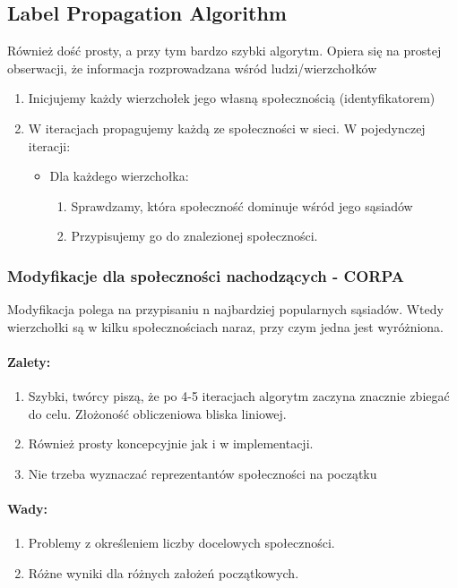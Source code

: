 \documentclass{article}
\begin{document}
\subsection{Label Propagation Algorithm}
Również dość prosty, a przy tym bardzo szybki algorytm. Opiera się na prostej obserwacji, że informacja rozprowadzana wśród ludzi/wierzchołków
\begin{enumerate}
    \item Inicjujemy każdy wierzchołek jego własną społecznością (identyfikatorem)
    \item W iteracjach propagujemy każdą ze społeczności w sieci. W pojedynczej iteracji:
    \begin{itemize}
        \item Dla każdego wierzchołka:
        \begin{enumerate}
            \item Sprawdzamy, która społeczność dominuje wśród jego sąsiadów
            \item Przypisujemy go do znalezionej społeczności. 
        \end{enumerate}
    \end{itemize}
\end{enumerate}

\subsubsection{Modyfikacje dla społeczności nachodzących - CORPA}
Modyfikacja polega na przypisaniu n najbardziej popularnych sąsiadów. Wtedy wierzchołki są w kilku społecznościach naraz, przy czym jedna jest wyróżniona.

\paragraph{Zalety:}
\begin{enumerate}
    \item Szybki, twórcy piszą, że po 4-5 iteracjach algorytm zaczyna znacznie zbiegać do celu. Złożoność obliczeniowa bliska liniowej.
    \item Również prosty koncepcyjnie jak i w implementacji.
    \item Nie trzeba wyznaczać reprezentantów społeczności na początku
\end{enumerate}
\paragraph{Wady:} 
\begin{enumerate}
    \item Problemy z określeniem liczby docelowych społeczności.
    \item Różne wyniki dla różnych założeń początkowych.
\end{enumerate}
\end{document}
